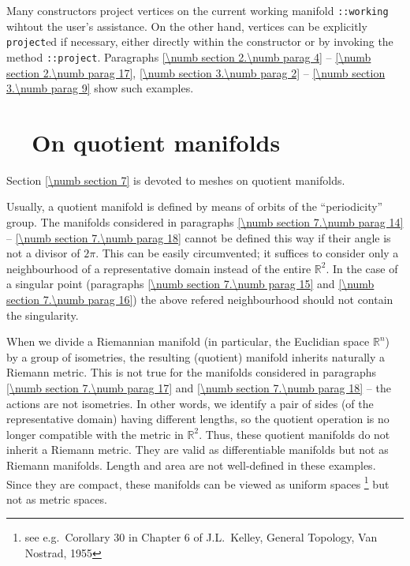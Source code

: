Many {\small\tt{}} constructors project vertices on the current working manifold
{\small\tt{}::working} wihtout the user's assistance.
On the other hand, vertices can be explicitly {\small\tt project}ed if necessary,
either directly within the {\small\tt{}} constructor or by invoking the method
{\small\tt{}::project}.
Paragraphs \ref{\numb section 2.\numb parag 4} -- \ref{\numb section 2.\numb parag 17},
\ref{\numb section 3.\numb parag 2} -- \ref{\numb section 3.\numb parag 9} show such examples.


\section{~~On quotient manifolds}\label{\numb section 8.\numb parag 2}

Section \ref{\numb section 7} is devoted to meshes on quotient manifolds.

Usually, a quotient manifold is defined by means of orbits of the ``periodicity'' group.
The manifolds considered in paragraphs \ref{\numb section 7.\numb parag 14} --
\ref{\numb section 7.\numb parag 18} cannot be defined this way if their angle is not a
divisor of $ 2\pi $.
This can be easily circumvented; it suffices to consider only a neighbourhood of a representative
domain instead of the entire $ \mathbb{R}^2 $.
In the case of a singular point (paragraphs \ref{\numb section 7.\numb parag 15} and
\ref{\numb section 7.\numb parag 16}) the above refered neighbourhood should not contain
the singularity.

When we divide a Riemannian manifold (in particular, the Euclidian space $ \mathbb{R}^n $)
by a group of isometries, the resulting (quotient) manifold inherits naturally a Riemann metric.
This is not true for the manifolds considered in paragraphs \ref{\numb section 7.\numb parag 17}
and \ref{\numb section 7.\numb parag 18} -- the actions are not isometries.
In other words, we identify a pair of sides (of the representative domain) having different lengths,
so the quotient operation is no longer compatible with the metric in $ \mathbb{R}^2 $.
Thus, these quotient manifolds do not inherit a Riemann metric.
They are valid as differentiable manifolds but not as Riemann manifolds.
Length and area are not well-defined in these examples.
Since they are compact, these manifolds can be viewed as uniform spaces%
\footnote {{} see e.g.\ Corollary 30 in Chapter 6 of J.L.~Kelley, General Topology, Van Nostrad, 1955}
but not as metric spaces.


